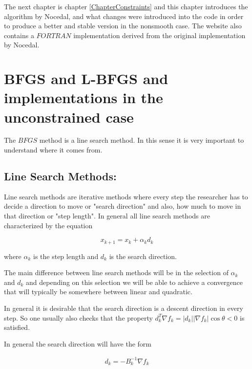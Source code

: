 The next chapter is chapter \ref{ChapterConstraints} and this chapter introduces the algorithm by Nocedal, and what changes were introduced into the code in order to produce a better and stable version in the nonsmooth case.  The website also contains a $FORTRAN$ implementation derived from the original implementation by Nocedal.

\chapter{BFGS and L-BFGS and implementations in the unconstrained case}
\label{ChapterBFGS} %

The $BFGS$ method is a line search method.  In this sense it is very important to understand where it comes from.

\section{Line Search Methods:}

Line search methods are iterative methods where every step the researcher has to decide a direction to move or "search direction" and also, how much to move in that direction or "step length".  In general all line search methods are characterized by the equation

\begin{equation} \label{basiclinesearch}
  x_{k+1} = x_k + \alpha_k d_k
\end{equation}

where $\alpha_k$ is the step length and $d_k$ is the search direction.

The main difference between line search methods will be in the selection of $\alpha_k$ and $d_k$ and depending on this selection we will be able to achieve a convergence that will typically be somewhere between linear and quadratic.

In general it is desirable that the search direction is a descent direction in every step.  So one usually also checks that the property $d_k^T \nabla f_k = |d_k||\nabla f_k| \cos{\theta} < 0$ is satisfied.

In general the search direction will have the form 

\begin{equation} \label{searchdirection}
    \begin{aligned}
      d_k = -B_{k}^{-1} \nabla f_k
    \end{aligned}
\end{equation}
 
